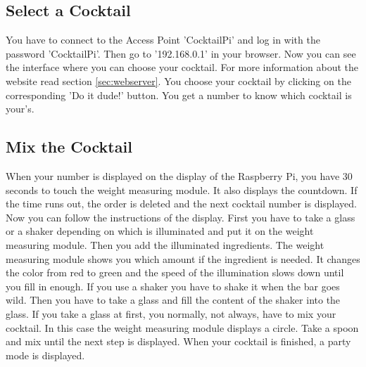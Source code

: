 \documentclass{acm_proc_article-sp}
\begin{document}
 \subsection{Select a Cocktail}
You have to connect to the Access Point 'CocktailPi' and log in with the password 'CocktailPi'. Then go to '192.168.0.1' in your browser. Now you can see the interface where you can choose your cocktail. For more information about the website read section \ref{sec:webserver}. You choose your cocktail by clicking on the corresponding 'Do it dude!' button. You get a number to know which cocktail is your's.

\begin{minipage}{\linewidth}%
\label{fig:select_cocktail}%
\end{minipage}

 \subsection{Mix the Cocktail}
When your number is displayed on the display of the Raspberry Pi, you have 30 seconds to touch the weight measuring module. It also displays the countdown. If the time runs out, the order is deleted and the next cocktail number is displayed. \\
Now you can follow the instructions of the display. First you have to take a glass or a shaker depending on which is illuminated and put it on the weight measuring module. Then you add the illuminated ingredients. The weight measuring module shows you which amount if the ingredient is needed. It changes the color from red to green and the speed of the illumination slows down until you fill in enough. If you use a shaker you have to shake it when the bar goes wild. Then you have to take a glass and fill the content of the shaker into the glass. If you take a glass at first, you normally, not always, have to mix your cocktail. In this case the weight measuring module displays a circle. Take a spoon and mix until the next step is displayed. When your cocktail is finished, a party mode is displayed. 
\end{document}
